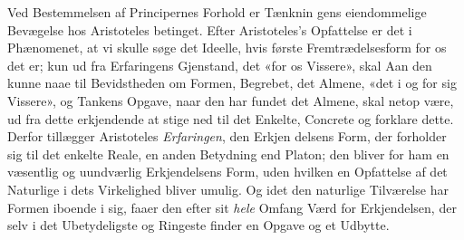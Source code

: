 \documentclass[12pt,a4paper]{book}
\newcommand{\gk}[1]{\textit{#1}}
\begin{document}
Ved Bestemmelsen af Principernes Forhold er Tænknin\-%
gens eiendommelige Bevægelse hos Aristoteles betinget. Efter
Aristoteles's Opfattelse er det i Phænomenet, at vi skulle søge
det Ideelle, hvis første Fremtrædelsesform for os det er; kun
ud fra Erfaringens Gjenstand, det «for os Vissere», skal Aan\-%
den kunne naae til Bevidstheden om Formen, Begrebet, det
Almene, «det i og for sig Vissere», og Tankens Opgave, naar
den har fundet det Almene, skal netop være, ud fra dette
erkjendende at stige ned til det Enkelte, Concrete og forklare
dette. Derfor tillægger Aristoteles \emph{Erfaringen}, den Erkjen\-%
delsens Form, der forholder sig til det enkelte Reale, en anden
Betydning end Platon; den bliver for ham en væsentlig og
uundværlig Erkjendelsens Form, uden hvilken en Opfattelse
af det Naturlige i dets Virkelighed bliver umulig. Og idet
den naturlige Tilværelse har Formen iboende i sig, faaer den
efter sit \emph{hele} Omfang Værd for Erkjendelsen, der selv i det
Ubetydeligste og Ringeste finder en Opgave og et Udbytte.
\end{document}
